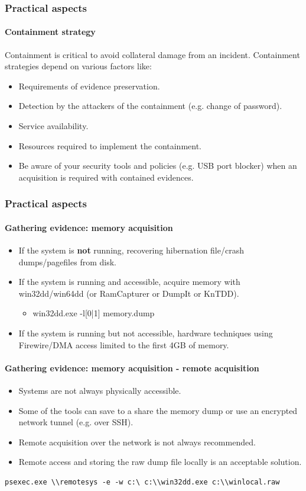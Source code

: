 \begin{frame}[fragile]
\frametitle{Practical aspects}
\framesubtitle{Containment strategy}
Containment is critical to avoid collateral damage from an incident. Containment strategies depend on various factors like:
\begin{itemize}
\item Requirements of evidence preservation.
\item Detection by the attackers of the containment (e.g. change of password).
\item Service availability.
\item Resources required to implement the containment.
\item Be aware of your security tools and policies (e.g. USB port blocker) when an acquisition is required with contained evidences.
\end{itemize}
\end{frame}


\begin{frame}[fragile]
\frametitle{Practical aspects}
\framesubtitle{Gathering evidence: memory acquisition}
\begin{itemize}
\item If the system is \textbf{not} running, recovering hibernation file/crash dumps/pagefiles from disk.
\item If the system is running and accessible, acquire memory with win32dd/win64dd (or RamCapturer or DumpIt or KnTDD).
\begin{itemize}
\item  win32dd.exe -l[0|1] memory.dump
\end{itemize}
\item If the system is running but not accessible, hardware techniques using Firewire/DMA access limited to the first 4GB of memory.
\end{itemize}
\end{frame}

\begin{frame}[fragile]
\framesubtitle{Gathering evidence: memory acquisition - remote acquisition}
\begin{itemize}
\item Systems are not always physically accessible.
\item Some of the tools can save to a share the memory dump or use an encrypted network tunnel (e.g. over SSH).
\item Remote acquisition over the network is not always recommended.
\item Remote access and storing the raw dump file locally is an acceptable solution.
\end{itemize}

\begin{lstlisting}
psexec.exe \\remotesys -e -w c:\ c:\\win32dd.exe c:\\winlocal.raw
\end{lstlisting}
\end{frame}


